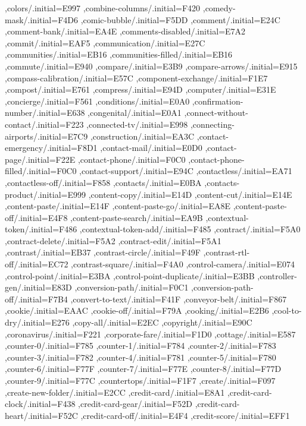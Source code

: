 { ,colors/.initial=E997
 ,combine-columns/.initial=F420
 ,comedy-mask/.initial=F4D6
 ,comic-bubble/.initial=F5DD
 ,comment/.initial=E24C
 ,comment-bank/.initial=EA4E
 ,comments-disabled/.initial=E7A2
 ,commit/.initial=EAF5
 ,communication/.initial=E27C
 ,communities/.initial=EB16
 ,communities-filled/.initial=EB16
 ,commute/.initial=E940
 ,compare/.initial=E3B9
 ,compare-arrows/.initial=E915
 ,compass-calibration/.initial=E57C
 ,component-exchange/.initial=F1E7
 ,compost/.initial=E761
 ,compress/.initial=E94D
 ,computer/.initial=E31E
 ,concierge/.initial=F561
 ,conditions/.initial=E0A0
 ,confirmation-number/.initial=E638
 ,congenital/.initial=E0A1
 ,connect-without-contact/.initial=F223
 ,connected-tv/.initial=E998
 ,connecting-airports/.initial=E7C9
 ,construction/.initial=EA3C
 ,contact-emergency/.initial=F8D1
 ,contact-mail/.initial=E0D0
 ,contact-page/.initial=F22E
 ,contact-phone/.initial=F0C0
 ,contact-phone-filled/.initial=F0C0
 ,contact-support/.initial=E94C
 ,contactless/.initial=EA71
 ,contactless-off/.initial=F858
 ,contacts/.initial=E0BA
 ,contacts-product/.initial=E999
 ,content-copy/.initial=E14D
 ,content-cut/.initial=E14E
 ,content-paste/.initial=E14F
 ,content-paste-go/.initial=EA8E
 ,content-paste-off/.initial=E4F8
 ,content-paste-search/.initial=EA9B
 ,contextual-token/.initial=F486
 ,contextual-token-add/.initial=F485
 ,contract/.initial=F5A0
 ,contract-delete/.initial=F5A2
 ,contract-edit/.initial=F5A1
 ,contrast/.initial=EB37
 ,contrast-circle/.initial=F49F
 ,contrast-rtl-off/.initial=EC72
 ,contrast-square/.initial=F4A0
 ,control-camera/.initial=E074
 ,control-point/.initial=E3BA
 ,control-point-duplicate/.initial=E3BB
 ,controller-gen/.initial=E83D
 ,conversion-path/.initial=F0C1
 ,conversion-path-off/.initial=F7B4
 ,convert-to-text/.initial=F41F
 ,conveyor-belt/.initial=F867
 ,cookie/.initial=EAAC
 ,cookie-off/.initial=F79A
 ,cooking/.initial=E2B6
 ,cool-to-dry/.initial=E276
 ,copy-all/.initial=E2EC
 ,copyright/.initial=E90C
 ,coronavirus/.initial=F221
 ,corporate-fare/.initial=F1D0
 ,cottage/.initial=E587
 ,counter-0/.initial=F785
 ,counter-1/.initial=F784
 ,counter-2/.initial=F783
 ,counter-3/.initial=F782
 ,counter-4/.initial=F781
 ,counter-5/.initial=F780
 ,counter-6/.initial=F77F
 ,counter-7/.initial=F77E
 ,counter-8/.initial=F77D
 ,counter-9/.initial=F77C
 ,countertops/.initial=F1F7
 ,create/.initial=F097
 ,create-new-folder/.initial=E2CC
 ,credit-card/.initial=E8A1
 ,credit-card-clock/.initial=F438
 ,credit-card-gear/.initial=F52D
 ,credit-card-heart/.initial=F52C
 ,credit-card-off/.initial=E4F4
 ,credit-score/.initial=EFF1
}

